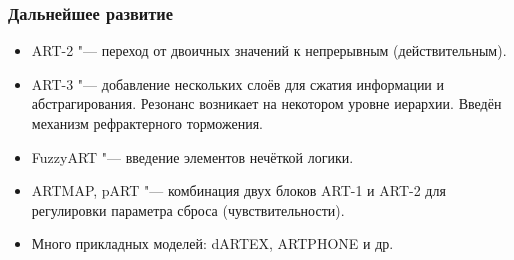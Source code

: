 \documentclass[default]{beamer}
\begin{document}
	\begin{frame}
		\frametitle{Дальнейшее развитие}
		
		\begin{itemize}
			\item ART-2 "--- переход от двоичных значений к непрерывным (действительным).
			\item ART-3 "--- добавление нескольких слоёв для сжатия информации и абстрагирования. Резонанс возникает на некотором уровне иерархии. Введён механизм рефрактерного торможения.
			\item FuzzyART "--- введение элементов нечёткой логики.
			\item ARTMAP, pART "--- комбинация двух блоков ART-1 и ART-2 для регулировки параметра сброса (чувствительности).
			\item Много прикладных моделей: dARTEX, ARTPHONE и др.
		\end{itemize}
	\end{frame}
	
\end{document}

